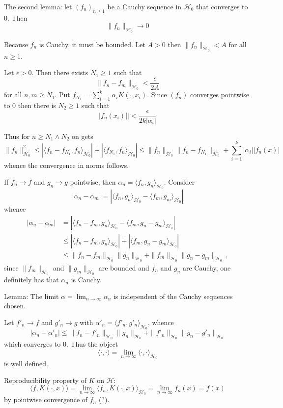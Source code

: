 \documentclass[a4paper]{article}
\newcommand{\Hcal}{\mathcal{H}}
\begin{document}
The second lemma:
let $(f_n)_{n\ge1}$ be a Cauchy sequence in $\Hcal_0$ that converges to $0$. Then
\[\|f_n\|_{\Hcal_0} \to 0\]

Because $f_n$ is Cauchy, it must be bounded. Let $A>0$ then $\|f_n\|_{\Hcal_0} < A$ for all $n\geq1$.

Let $\epsilon>0$. Then there exists $N_1\geq 1$ such that
\[ \|f_n - f_m\|_{\Hcal_0} < \frac{\epsilon}{2A}\] 
for all $n,m\geq N_1$. Put $f_{N_1} = \sum_{i=1}^k \alpha_i K(\cdot, x_i)$.
Since $(f_n)$ converges pointwise to $0$ then there is $N_2\geq 1$ such that
\[ |f_n(x_i)| |< \frac{\epsilon}{2k|\alpha_i|} \]

Thus for $n\geq N_1\wedge N_2$ on gets
\[
\|f_n\|^2_{\Hcal_0} \leq | \langle f_n -f_{N_1}, f_n\rangle_{\Hcal_0}|
+ | \langle f_{N_1}, f_n\rangle_{\Hcal_0}|
\leq \|f_n\|_{\Hcal_0} \|f_n-f_{N_1}\|_{\Hcal_0} + \sum_{i=1}^k |\alpha_i| |f_n(x)|
\]
whence the convergence in norms follows.

If $f_n\to f$ and $g_n\to g$ pointwise, then $\alpha_n = \langle f_n, g_n\rangle_{\Hcal_0}$.
Consider
\[
|\alpha_n - \alpha_m | 
= |\langle f_n, g_n\rangle_{\Hcal_0}
- \langle f_m, g_m\rangle_{\Hcal_0} |
\]
whence
\begin{align*}
	| \alpha_n - \alpha_m | 
	&= |\langle f_n-f_m, g_n\rangle_{\Hcal_0}
	- \langle f_m, g_n-g_m\rangle_{\Hcal_0} | \\
	&\leq |\langle f_n-f_m, g_n\rangle_{\Hcal_0}|
	+ |\langle f_m, g_n-g_m\rangle_{\Hcal_0} | \\
	&\leq \|f_n-f_m\|_{\Hcal_0} \|g_n\|_{\Hcal_0}
	+ \|f_m\|_{\Hcal_0} \|g_n-g_m\|_{\Hcal_0}\,,
\end{align*}
since $\|f_m\|_{\Hcal_0}$ and $\|g_m\|_{\Hcal_0}$ are bounded and $f_n$ and $g_n$ are Cauchy,
one definitely has that $\alpha_n$ is Cauchy.

Lemma: The limit $\alpha = \lim_{n\to \infty} \alpha_n$ is independent of the Cauchy sequences chosen.

Let $f'_n\to f$ and $g'_n\to g$ with $\alpha'_n = \langle f'_n, g'_n\rangle_{\Hcal_0}$, whence
\[
|\alpha_n - \alpha'_n| \leq \|f_n-f'_n\|_{\Hcal_0} \|g_n\|_{\Hcal_0}
+ \|f'_n\|_{\Hcal_0} \|g_n-g'_n\|_{\Hcal_0}
\]
which converges to $0$. Thus the object
\[
\langle \cdot, \cdot \rangle = \lim_{n\to \infty}\langle \cdot,\cdot \rangle_{\Hcal_0}
\]
is well defined.

Reproducibility property of $K$ on $\Hcal$:
\[
\langle f, K(\cdot,x) \rangle
= \lim_{n\to \infty} \langle f_n,K(\cdot, x) \rangle_{\Hcal_0}
= \lim_{n\to \infty} f_n(x)
= f(x)
\]
by pointwise convergence of $f_n$ (?).
\end{document}
